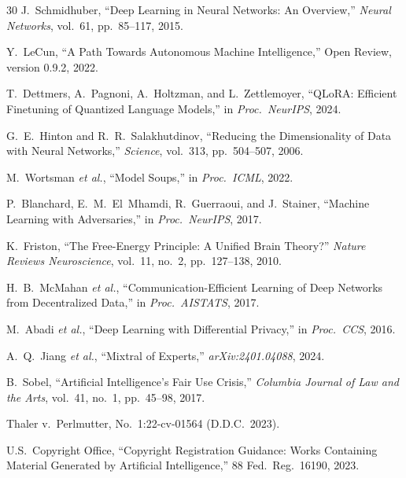 \documentclass[11pt,letterpaper]{article}
\begin{document}
\begin{thebibliography}{30}
J.~Schmidhuber, ``Deep Learning in Neural Networks: An Overview,'' \emph{Neural Networks}, vol.~61, pp.~85--117, 2015.

Y.~LeCun, ``A Path Towards Autonomous Machine Intelligence,'' Open Review, version 0.9.2, 2022.

T.~Dettmers, A.~Pagnoni, A.~Holtzman, and L.~Zettlemoyer, ``QLoRA: Efficient Finetuning of Quantized Language Models,'' in \emph{Proc.\ NeurIPS}, 2024.

G.~E.~Hinton and R.~R.~Salakhutdinov, ``Reducing the Dimensionality of Data with Neural Networks,'' \emph{Science}, vol.~313, pp.~504--507, 2006.

M.~Wortsman \emph{et al.}, ``Model Soups,'' in \emph{Proc.\ ICML}, 2022.

P.~Blanchard, E.~M.~El~Mhamdi, R.~Guerraoui, and J.~Stainer, ``Machine Learning with Adversaries,'' in \emph{Proc.\ NeurIPS}, 2017.

K.~Friston, ``The Free-Energy Principle: A Unified Brain Theory?'' \emph{Nature Reviews Neuroscience}, vol.~11, no.~2, pp.~127--138, 2010.

H.~B.~McMahan \emph{et al.}, ``Communication-Efficient Learning of Deep Networks from Decentralized Data,'' in \emph{Proc.\ AISTATS}, 2017.

M.~Abadi \emph{et al.}, ``Deep Learning with Differential Privacy,'' in \emph{Proc.\ CCS}, 2016.

A.~Q.~Jiang \emph{et al.}, ``Mixtral of Experts,'' \emph{arXiv:2401.04088}, 2024.

B.~Sobel, ``Artificial Intelligence's Fair Use Crisis,'' \emph{Columbia Journal of Law and the Arts}, vol.~41, no.~1, pp.~45--98, 2017.

Thaler v.\ Perlmutter, No.~1:22-cv-01564 (D.D.C.\ 2023).

U.S.~Copyright Office, ``Copyright Registration Guidance: Works Containing Material Generated by Artificial Intelligence,'' 88 Fed.\ Reg.\ 16190, 2023.

\end{thebibliography}
\end{document}
